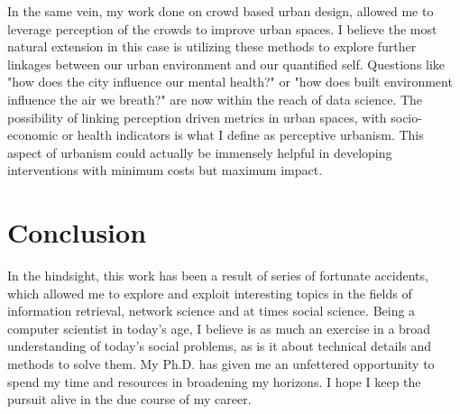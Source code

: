 In the same vein, my work done on crowd based urban design, allowed me to leverage perception of the crowds to improve urban spaces. I believe the most natural extension in this case is utilizing these methods to explore further linkages between our urban environment and our quantified self. Questions like "how does the city influence our mental health?" or "how does built environment influence the air we breath?" are now within the reach of data science. The possibility of linking perception driven metrics in urban spaces, with socio-economic or health indicators is what I define as perceptive urbanism. 
This aspect of urbanism could actually be immensely helpful in developing interventions with minimum costs but maximum impact. 

\section{Conclusion}

In the hindsight, this work has been a result of series of fortunate accidents, which allowed me to explore and exploit interesting topics in the fields of information retrieval, network science and at times social science. Being a computer scientist in today's age, I believe is as much an exercise in a broad understanding of today's social problems, as is it about technical details and methods to solve them. My Ph.D. has given me an unfettered opportunity to spend my time and resources in broadening my horizons. I hope I keep the pursuit alive in the due course of my career. 